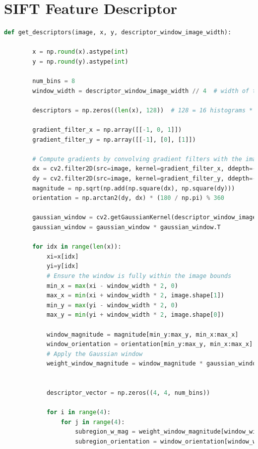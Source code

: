 \section*{SIFT Feature Descriptor}
\begin{lstlisting}[language=python]
    def get_descriptors(image, x, y, descriptor_window_image_width):
        
        x = np.round(x).astype(int)
        y = np.round(y).astype(int)

        num_bins = 8
        window_width = descriptor_window_image_width // 4  # width of the 4x4 cells in a window

        descriptors = np.zeros((len(x), 128))  # 128 = 16 histograms * 8 bins per histogram

        gradient_filter_x = np.array([[-1, 0, 1]])
        gradient_filter_y = np.array([[-1], [0], [1]])

        # Compute gradients by convolving gradient filters with the image
        dx = cv2.filter2D(src=image, kernel=gradient_filter_x, ddepth=-1)
        dy = cv2.filter2D(src=image, kernel=gradient_filter_y, ddepth=-1)
        magnitude = np.sqrt(np.add(np.square(dx), np.square(dy)))
        orientation = np.arctan2(dy, dx) * (180 / np.pi) % 360

        gaussian_window = cv2.getGaussianKernel(descriptor_window_image_width, descriptor_window_image_width / 2)
        gaussian_window = gaussian_window * gaussian_window.T

        for idx in range(len(x)):
            xi=x[idx]
            yi=y[idx]
            # Ensure the window is fully within the image bounds
            min_x = max(xi - window_width * 2, 0) 
            max_x = min(xi + window_width * 2, image.shape[1])
            min_y = max(yi - window_width * 2, 0)
            max_y = min(yi + window_width * 2, image.shape[0])

            window_magnitude = magnitude[min_y:max_y, min_x:max_x]
            window_orientation = orientation[min_y:max_y, min_x:max_x]
            # Apply the Gaussian window
            weight_window_magnitude = window_magnitude * gaussian_window[min_y - yi + window_width * 2:max_y - yi + window_width * 2,
                                                                        min_x - xi + window_width * 2:max_x - xi + window_width * 2]

            descriptor_vector = np.zeros((4, 4, num_bins))

            for i in range(4):
                for j in range(4):
                    subregion_w_mag = weight_window_magnitude[window_width*i:window_width*(i+1), window_width*j:window_width*(j+1)].flatten()
                    subregion_orientation = window_orientation[window_width*i:window_width*(i+1), window_width*j:window_width*(j+1)].flatten()


\end{lstlisting}
